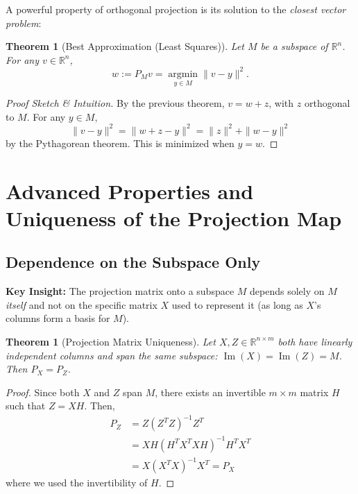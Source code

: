 \documentclass[12pt]{article}
\theoremstyle{definition}
\theoremstyle{plain}
\newtheorem{theorem}[definition]{Theorem}
\theoremstyle{remark}
\begin{document}
A powerful property of orthogonal projection is its solution to the \emph{closest vector problem}:

\begin{theorem}[Best Approximation (Least Squares)]
    Let $M$ be a subspace of $\mathbb{R}^n$. For any $v \in \mathbb{R}^n$,
    \[
        w := P_M v = \operatorname*{argmin}_{y \in M} \|v - y\|^2.
    \]
\end{theorem}

\begin{proof}[Proof Sketch \& Intuition]
    By the previous theorem, $v = w + z$, with $z$ orthogonal to $M$. For any $y \in M$,
    \[
        \|v - y\|^2 = \|w + z - y\|^2 = \|z\|^2 + \|w - y\|^2
    \]
    by the Pythagorean theorem. This is minimized when $y = w$.
\end{proof}

\section{Advanced Properties and Uniqueness of the Projection Map}

\subsection{Dependence on the Subspace Only}

\textbf{Key Insight:} The projection matrix onto a subspace $M$ depends solely on $M$ \emph{itself} and not on the specific matrix $X$ used to represent it (as long as $X$'s columns form a basis for $M$).

\begin{theorem}[Projection Matrix Uniqueness]
    Let $X, Z \in \mathbb{R}^{n \times m}$ both have linearly independent columns and span the same subspace: $\operatorname{Im}(X) = \operatorname{Im}(Z) = M$. Then $P_X = P_Z$.
\end{theorem}

\begin{proof}
    Since both $X$ and $Z$ span $M$, there exists an invertible $m \times m$ matrix $H$ such that $Z = X H$. Then,
    \begin{align*}
        P_Z &= Z (Z^T Z)^{-1} Z^T \\
            &= X H (H^T X^T X H)^{-1} H^T X^T \\
            &= X (X^T X)^{-1} X^T = P_X
    \end{align*}
    where we used the invertibility of $H$.
\end{proof}
\end{document}
